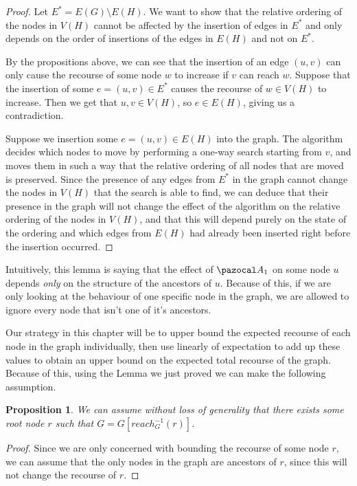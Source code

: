 \documentclass{report}
\newtheorem{proposition}{Proposition}
\begin{document}
\begin{proof}
Let $E^* = E(G) \setminus E(H)$. We want to show that the relative ordering of the nodes in $V(H)$ cannot be affected by the insertion of edges in $E^*$ and only depends on the order of insertions of the edges in $E(H)$ and not on $E^*$.

By the propositions above, we can see that the insertion of an edge $(u,v)$ can only cause the recourse of some node $w$ to increase if $v$ can reach $w$. Suppose that the insertion of some $e = (u,v) \in E^*$ causes the recourse of $w \in V(H)$ to increase. Then we get that $u,v \in V(H)$, so $e \in E(H)$, giving us a contradiction.

Suppose we insertion some $e = (u,v) \in E(H)$ into the graph. The algorithm decides which nodes to move by performing a one-way search starting from $v$, and moves them in such a way that the relative ordering of all nodes that are moved is preserved. Since the presence of any edges from $E^*$ in the graph cannot change the nodes in $V(H)$ that the search is able to find, we can deduce that their presence in the graph will not change the effect of the algorithm on the relative ordering of the nodes in $V(H)$, and that this will depend purely on the state of the ordering and which edges from $E(H)$ had already been inserted right before the insertion occurred.
\end{proof}

Intuitively, this lemma is saying that the effect of $\pazocal A_1$ on some node $u$ depends \textit{only} on the structure of the ancestors of $u$. Because of this, if we are only looking at the behaviour of one specific node in the graph, we are allowed to ignore every node that isn't one of it's ancestors.

Our strategy in this chapter will be to upper bound the expected recourse of each node in the graph individually, then use linearly of expectation to add up these values to obtain an upper bound on the expected total recourse of the graph. Because of this, using the Lemma we just proved we can make the following assumption.

\begin{proposition}
We can assume without loss of generality that there exists some root node $r$ such that $G = G[reach_G^{-1}(r)]$.
\end{proposition}

\begin{proof}
Since we are only concerned with bounding the recourse of some node $r$, we can assume that the only nodes in the graph are ancestors of $r$, since this will not change the recourse of $r$.
\end{proof}
\end{document}
